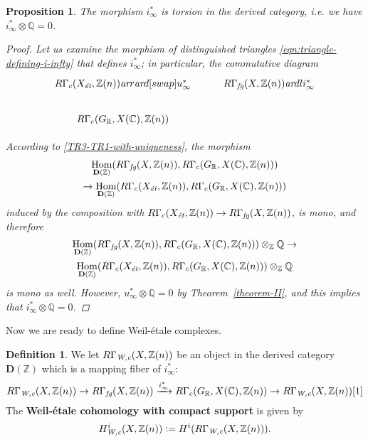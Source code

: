 \documentclass[draft,leqno,12pt]{article}
\theoremstyle{plain}
\newtheorem{proposition}[theorem]{\indent\sc Proposition}
\theoremstyle{definition}
\newtheorem{definition}[theorem]{\indent\sc Definition}
\DeclareMathOperator{\Hom}{Hom}
\newcommand{\ZZ}{\mathbb{Z}}
\newcommand{\QQ}{\mathbb{Q}}
\newcommand{\RR}{\mathbb{R}}
\newcommand{\CC}{\mathbb{C}}
\newcommand{\dfn}{\mathrel{\mathop:}=}
\newcommand{\Wc}{\text{\it W,c}}
\newcommand{\et}{\text{\it \'{e}t}}
\newcommand{\fg}{\text{\it fg}}
\newcommand{\ar}{\text{\it ar}}
\begin{document}
\begin{proposition}
  \label{i-infty-is-torsion}
  The morphism $i_\infty^*$ is torsion in the derived category,
  i.e. we have $i_\infty^*\otimes \QQ = 0$.

  \begin{proof}
    Let us examine the morphism of distinguished triangles
    \eqref{eqn:triangle-defining-i-infty} that defines $i_\infty^*$; in
    particular, the commutative diagram
    \[ \begin{tikzcd}
      R\Gamma_c (X_\et, \ZZ (n)) \ar{r}\ar{d}[swap]{u_\infty^*} & R\Gamma_\fg (X, \ZZ (n))\ar{dl}{i_\infty^*} \\
      R\Gamma_c (G_\RR, X (\CC), \ZZ (n))
    \end{tikzcd} \]

    According to \ref{TR3-TR1-with-uniqueness}, the morphism
    \begin{multline*}
      \Hom_{\mathbf{D} (\ZZ)} (R\Gamma_\fg (X,\ZZ (n)), R\Gamma_c (G_\RR, X (\CC), \ZZ (n))) \\
      \to
      \Hom_{\mathbf{D} (\ZZ)} (R\Gamma_c (X_\et, \ZZ (n)), R\Gamma_c (G_\RR, X (\CC), \ZZ (n)))
    \end{multline*}
    induced by the composition with
    $R\Gamma_c (X_\et, \ZZ (n)) \to R\Gamma_\fg (X,\ZZ (n))$, is mono, and
    therefore
    \begin{multline*}
      \Hom_{\mathbf{D} (\ZZ)} (R\Gamma_\fg (X,\ZZ (n)), R\Gamma_c (G_\RR, X (\CC), \ZZ (n)))\otimes_\ZZ \QQ \to\\
      \Hom_{\mathbf{D} (\ZZ)} (R\Gamma_c (X_\et, \ZZ (n)), R\Gamma_c (G_\RR, X (\CC), \ZZ (n)))\otimes_\ZZ \QQ
    \end{multline*}
    is mono as well. However, $u_\infty^*\otimes \QQ = 0$ by
    Theorem~\ref{theorem-II}, and this implies that $i_\infty^*\otimes \QQ = 0$.
  \end{proof}
\end{proposition}

Now we are ready to define Weil-\'{e}tale complexes.

\begin{definition}
  \label{dfn:RGammaWc}
  We let
  $R\Gamma_\Wc (X,\ZZ(n))$ be an object in the derived category
  $\mathbf{D} (\ZZ)$ which is a mapping fiber of $i_\infty^*$:
  \[ R\Gamma_\Wc (X,\ZZ(n)) \to
  R\Gamma_\fg (X, \ZZ (n)) \xrightarrow{i_\infty^*}
  R\Gamma_c (G_\RR, X (\CC), \ZZ (n)) \to
  R\Gamma_\Wc (X,\ZZ(n)) [1] \]
  The \textbf{Weil-\'{e}tale cohomology with compact support} is given by
  $$H_\Wc^i (X, \ZZ (n)) \dfn H^i (R\Gamma_\Wc (X,\ZZ(n))).$$
\end{definition}
\end{document}
